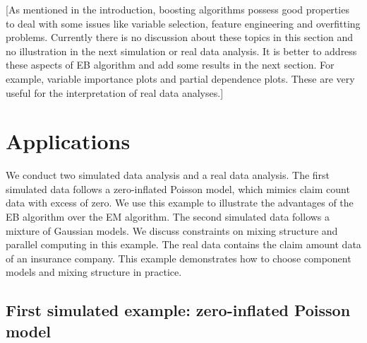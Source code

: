 \documentclass[11pt]{article}
\numberwithin{equation}{section}
\begin{document}
{\color{blue}[As mentioned in the introduction, boosting algorithms possess good properties to deal with some issues like variable selection, feature engineering and overfitting problems. Currently there is no discussion about these topics in this section and no illustration in the next simulation or real data analysis. It is better to address these aspects of EB algorithm and add some results in the next section. For example, variable importance plots and partial dependence plots. These are very useful for the interpretation of real data analyses.]}

	
\section{Applications}\label{sec:application}

We conduct two simulated data analysis and a real data analysis. 
The first simulated data follows a zero-inflated Poisson model, which mimics claim count data with excess of zero.
We use this example to illustrate the advantages of the EB algorithm over the EM algorithm.
The second simulated data follows a mixture of Gaussian models. 
We discuss constraints on mixing structure and parallel computing in this example.
The real data contains the claim amount data of an insurance company. 
This example demonstrates how to choose component models and mixing structure in practice.

\subsection{First simulated example: zero-inflated Poisson model}
\end{document}
